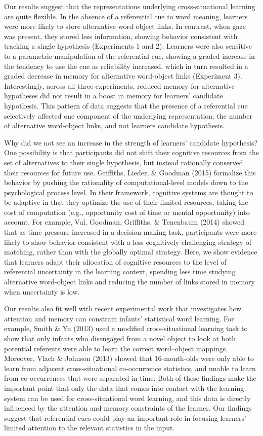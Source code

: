 \documentclass[12pt,]{article}
\begin{document}
Our results suggest that the representations underlying
cross-situational learning are quite flexible. In the absence of a
referential cue to word meaning, learners were more likely to store
alternative word-object links. In contrast, when gaze was present, they
stored less information, showing behavior consistent with tracking a
single hypothesis (Experiments 1 and 2). Learners were also sensitive to
a parametric manipulation of the referential cue, showing a graded
increase in the tendency to use the cue as reliability increased, which
in turn resulted in a graded decrease in memory for alternative
word-object links (Experiment 3). Interestingly, across all three
experiments, reduced memory for alternative hypotheses did not result in
a boost in memory for learners' candidate hypothesis. This pattern of
data suggests that the presence of a referential cue selectively
affected one component of the underlying representation: the number of
alternative word-object links, and not learners candidate hypothesis.

Why did we not see an increase in the strength of learners' candidate
hypothesis? One possibility is that participants did not shift their
cognitive resources from the set of alternatives to their single
hypothesis, but instead rationally conserved their resources for future
use. Griffiths, Lieder, \& Goodman (2015) formalize this behavior by
pushing the rationality of computational-level models down to the
psychological process level. In their framework, cognitive systems are
thought to be adaptive in that they optimize the use of their limited
resources, taking the cost of computation (e.g., opportunity cost of
time or mental opportunity) into account. For example, Vul, Goodman,
Griffiths, \& Tenenbaum (2014) showed that as time pressure increased in
a decision-making task, participants were more likely to show behavior
consistent with a less cognitively challenging strategy of matching,
rather than with the globally optimal strategy. Here, we show evidence
that learners adapt their allocation of cognitive resources to the level
of referential uncertainty in the learning context, spending less time
studying alternative word-object links and reducing the number of links
stored in memory when uncertainty is low.

Our results also fit well with recent experimental work that
investigates how attention and memory can constrain infants' statistical
word learning. For example, Smith \& Yu (2013) used a modified
cross-situational learning task to show that only infants who disengaged
from a novel object to look at both potential referents were able to
learn the correct word--object mappings. Moreover, Vlach \& Johnson
(2013) showed that 16-month-olds were only able to learn from adjacent
cross-situational co-occurrence statistics, and unable to learn from
co-occurrences that were separated in time. Both of these findings make
the important point that only the data that comes into contact with the
learning system can be used for cross-situational word learning, and
this data is directly influenced by the attention and memory constraints
of the learner. Our findings suggest that referential cues could play an
important role in focusing learners' limited attention to the relevant
statistics in the input.
\end{document}
